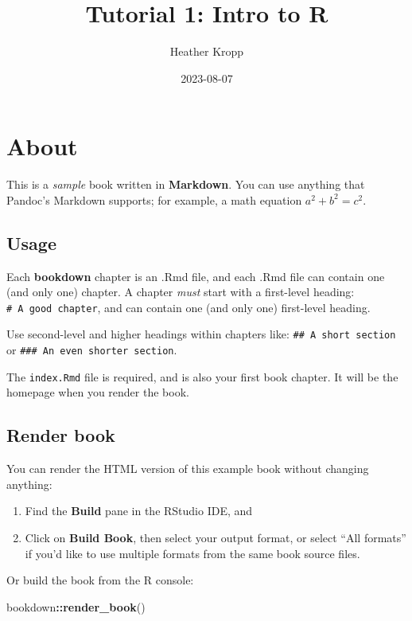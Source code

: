 \documentclass[
]{book}
\title{Tutorial 1: Intro to R}
\author{Heather Kropp}
\date{2023-08-07}
\newenvironment{Shaded}{\begin{snugshade}}{\end{snugshade}}
\newcommand{\FunctionTok}[1]{\textcolor[rgb]{0.13,0.29,0.53}{\textbf{#1}}}
\newcommand{\NormalTok}[1]{#1}
\newcommand{\SpecialCharTok}[1]{\textcolor[rgb]{0.81,0.36,0.00}{\textbf{#1}}}
\theoremstyle{definition}
\theoremstyle{definition}
\theoremstyle{definition}
\theoremstyle{definition}
\theoremstyle{remark}
\begin{document}
\maketitle

{
\setcounter{tocdepth}{1}
\tableofcontents
}
\hypertarget{about}{%
\chapter{About}\label{about}}

This is a \emph{sample} book written in \textbf{Markdown}. You can use anything that Pandoc's Markdown supports; for example, a math equation \(a^2 + b^2 = c^2\).

\hypertarget{usage}{%
\section{Usage}\label{usage}}

Each \textbf{bookdown} chapter is an .Rmd file, and each .Rmd file can contain one (and only one) chapter. A chapter \emph{must} start with a first-level heading: \texttt{\#\ A\ good\ chapter}, and can contain one (and only one) first-level heading.

Use second-level and higher headings within chapters like: \texttt{\#\#\ A\ short\ section} or \texttt{\#\#\#\ An\ even\ shorter\ section}.

The \texttt{index.Rmd} file is required, and is also your first book chapter. It will be the homepage when you render the book.

\hypertarget{render-book}{%
\section{Render book}\label{render-book}}

You can render the HTML version of this example book without changing anything:

\begin{enumerate}
\def\labelenumi{\arabic{enumi}.}
\item
  Find the \textbf{Build} pane in the RStudio IDE, and
\item
  Click on \textbf{Build Book}, then select your output format, or select ``All formats'' if you'd like to use multiple formats from the same book source files.
\end{enumerate}

Or build the book from the R console:

\begin{Shaded}
\begin{Highlighting}[]
\NormalTok{bookdown}\SpecialCharTok{::}\FunctionTok{render\_book}\NormalTok{()}
\end{Highlighting}
\end{Shaded}
\end{document}
